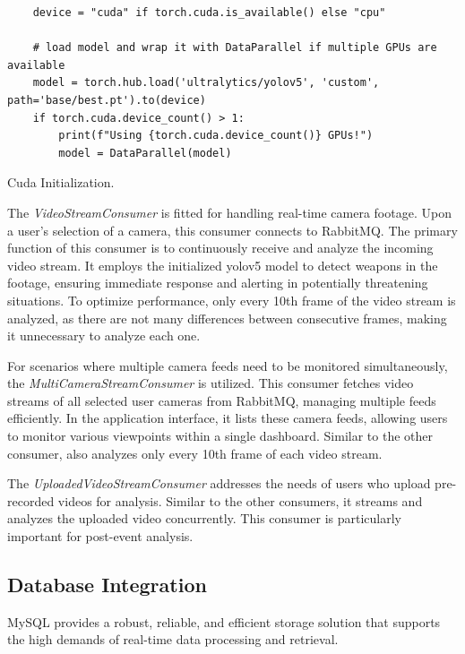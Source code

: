 \begin{listing}[h]
    \begin{verbatim}
    device = "cuda" if torch.cuda.is_available() else "cpu"

    # load model and wrap it with DataParallel if multiple GPUs are available
    model = torch.hub.load('ultralytics/yolov5', 'custom', path='base/best.pt').to(device)
    if torch.cuda.device_count() > 1:
        print(f"Using {torch.cuda.device_count()} GPUs!")
        model = DataParallel(model)
    \end{verbatim}
    \caption{Cuda Initialization.}
    \label{lbl:cuda-init}
    \end{listing}

The \textit{VideoStreamConsumer} is fitted for handling real-time camera footage. Upon a user's selection of a camera, 
this consumer connects to RabbitMQ. 
The primary function of this consumer is to continuously receive and analyze the incoming video stream. 
It employs the initialized \ac{yolo}v5 model to detect weapons in the footage, ensuring immediate response and 
alerting in potentially threatening situations. To optimize performance, only every 10th frame of the video stream 
is analyzed, as there are not many differences between consecutive frames, making it unnecessary to analyze each one.

For scenarios where multiple camera feeds need to be monitored simultaneously, the \textit{MultiCameraStreamConsumer} 
is utilized. This consumer fetches video streams of all selected user cameras from RabbitMQ, managing multiple 
feeds efficiently. In the application interface, it lists these camera feeds, allowing users to monitor various 
viewpoints within a single dashboard.
Similar to the other consumer, also analyzes only every 10th frame of each video stream.

The \textit{UploadedVideoStreamConsumer} addresses the needs of users who upload pre-recorded videos for analysis. 
Similar to the other consumers, it streams and analyzes the uploaded video concurrently. This consumer is particularly 
important for post-event analysis.

\subsection{Database Integration}
MySQL \cite{rfc58} provides a robust, reliable, and efficient storage solution that supports the high demands of 
real-time data processing and retrieval.

